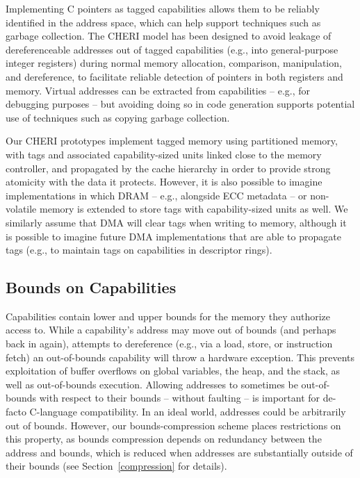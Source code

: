 Implementing C pointers as tagged capabilities allows them to be reliably
identified in the address space, which can help support techniques
such as garbage collection.
The CHERI model has been designed to avoid leakage of dereferenceable addresses out of
tagged capabilities (e.g., into general-purpose integer registers) during normal
memory allocation, comparison, manipulation, and dereference, to facilitate
reliable detection of pointers in both registers and memory.
Virtual addresses can be extracted from capabilities -- e.g., for debugging
purposes -- but avoiding doing so in code generation supports potential use
of techniques such as copying garbage collection.

Our CHERI 
prototypes implement tagged memory using partitioned memory, with tags and
associated capability-sized units linked close to the memory controller, and
propagated by the cache hierarchy in order to provide strong atomicity with
the data it protects.
However, it is also possible to imagine implementations in which DRAM --
e.g., alongside ECC metadata -- or
non-volatile memory is extended to store tags with capability-sized units as
well.
We similarly assume that DMA will clear tags when writing to memory, although
it is possible to imagine future DMA implementations that are able to
propagate tags (e.g., to maintain tags on capabilities in descriptor rings).

\subsection{Bounds on Capabilities}
\label{sec:model-bounds}

Capabilities contain lower and upper bounds for the memory they authorize
access to.
While a capability's address may move out of bounds (and perhaps back in
again), attempts to dereference (e.g., via a load, store, or instruction
fetch) an out-of-bounds capability will throw a hardware exception.
This prevents exploitation of buffer overflows on global variables, the heap,
and the stack, as well as out-of-bounds execution.
Allowing addresses to sometimes be out-of-bounds with respect to their
bounds -- without faulting -- is important for de-facto C-language
compatibility.
In an ideal world, addresses could be arbitrarily out of bounds.
However, our
bounds-compression scheme places restrictions on this property, as bounds
compression depends on redundancy between the address and bounds, which is
reduced when addresses are substantially outside of their bounds (see
Section~\ref{compression} for details).


